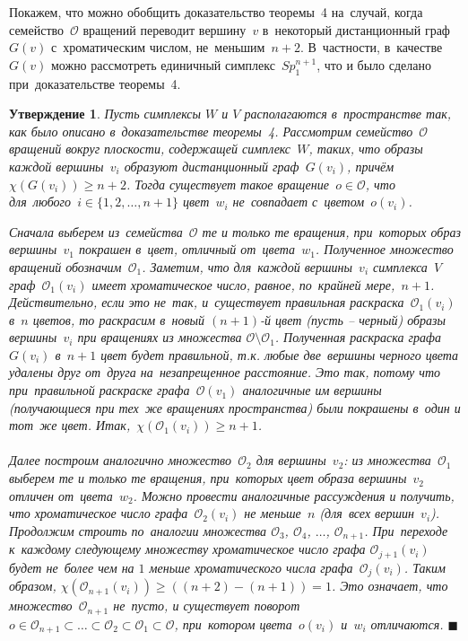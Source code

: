 \documentclass{report}%
\newtheorem{claim}{Утверждение}
\newenvironment{proof}{\par\noindent{\bf Доказательство.}}{\hfill$\scriptstyle\blacksquare$}
\begin{document}
\noindent Покажем, что можно обобщить доказательство теоремы~4 на~случай, 
когда семейство~$\mathcal{O}$ вращений переводит вершину~$v$ в~некоторый дистанционный граф~$G(v)$ 
с~хроматическим числом, не~меньшим~$n + 2$. В~частности, в~качестве~$G(v)$ 
можно рассмотреть единичный симплекс~$Sp_1^{n+1}$, что и было сделано при~доказательстве теоремы~4.

\begin{claim}
		Пусть симплексы $W$ и $V$ располагаются в~пространстве так, как было описано в~доказательстве теоремы~4.
		Рассмотрим семейство~$\mathcal{O}$ вращений вокруг плоскости, содержащей симплекс~$W$, таких,
		что образы каждой вершины~$v_i$ образуют дистанционный граф~$G(v_i)$, причём $\chi(G(v_i)) \geq n+2$.
		Тогда существует такое вращение~$o \in \mathcal{O}$, что для~любого~$i \in \{1, 2, \ldots, n + 1\}$ цвет~$w_i$ не~совпадает с~цветом~$o(v_i)$. \\
		\begin{proof}
				Сначала выберем из~семейства~$\mathcal{O}$ те и только те вращения, при~которых образ вершины~$v_1$ покрашен в~цвет,
				отличный от~цвета~$w_1$. Полученное множество вращений обозначим~$\mathcal{O}_1$.
				Заметим, что для~каждой вершины~$v_i$ симплекса~$V$ граф~$\mathcal{O}_1(v_i)$ имеет хроматическое число, равное, по~крайней мере,~$n+1$.
				Действительно, если это не~так, и~существует правильная раскраска~$\mathcal{O}_1(v_i)$ в~$n$ цветов,
				то раскрасим в~новый $(n+1)$-й цвет (пусть – черный) образы вершины~$v_i$ при вращениях из множества $\mathcal{O}\!\setminus\!\mathcal{O}_1$.
				Полученная раскраска графа~$G(v_i)$ в~$n+1$ цвет будет правильной,
				т.к. любые две~вершины черного цвета удалены друг от~друга на~незапрещенное расстояние.
				Это так, потому что при~правильной раскраске графа~$\mathcal{O}(v_1)$ аналогичные им вершины (получающиеся при тех~же вращениях пространства)
				были покрашены в~один и тот~же цвет. Итак,~$\chi(\mathcal{O}_1(v_i)) \geq n+1$. \\\\
				\noindent Далее построим аналогично множество~$\mathcal{O}_2$ для вершины~$v_2$: из множества~$\mathcal{O}_1$ выберем те и только те вращения,
				при~которых цвет образа вершины~$v_2$ отличен от~цвета~$w_2$. Можно провести аналогичные рассуждения и получить,
				что хроматическое число графа~$\mathcal{O}_2(v_i)$ не меньше~$n$ (для~всех вершин~$v_i$).
				Продолжим строить по~аналогии множества $\mathcal{O}_3$, $\mathcal{O}_4$, $\ldots$, $\mathcal{O}_{n+1}$.
				При~переходе к~каждому следующему множеству хроматическое число графа $\mathcal{O}_{j+1}(v_i)$
				будет не~более чем на $1$ меньше хроматического числа графа~$\mathcal{O}_j(v_i)$.
				Таким образом, $\chi(\mathcal{O}_{n+1}(v_i)) \geq ((n+2)-(n+1)) = 1$. Это означает, что множество~$\mathcal{O}_{n+1}$ не~пусто,
				и существует поворот $o \in \mathcal{O}_{n+1} \subset \ldots \subset \mathcal{O}_2 \subset \mathcal{O}_1 \subset \mathcal{O}$,
				при~котором цвета~$o(v_i)$ и~$w_i$ отличаются. 
		\end{proof}
\end{claim}
\newpage
\end{document}
